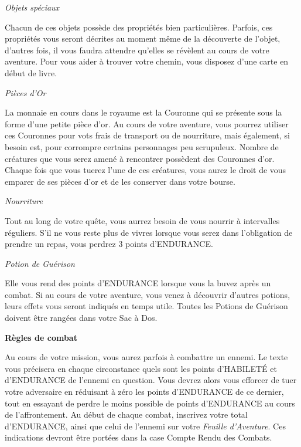 \documentclass[11pt]{book}
\begin{document}
\begin{center}
  \textit{Objets spéciaux}
\end{center}
Chacun de ces objets possède des propriétés bien particulières. Parfois, ces
propriétés vous seront décrites au moment même de la découverte de l'objet, d'autres
fois, il vous faudra attendre qu'elles se révèlent au cours de votre aventure. Pour
vous aider à trouver votre chemin, vous disposez d'une carte en début de livre.

\begin{center}
  \textit{Pièces d'Or}
\end{center}
La monnaie en cours dans le royaume est la Couronne qui se présente sous la forme
d'une petite pièce d'or. Au cours de votre aventure, vous pourrez utiliser ces
Couronnes pour vots frais de transport ou de nourriture, mais également, si besoin
est, pour corrompre certains personnages peu scrupuleux. Nombre de créatures que vous
serez amené à rencontrer possèdent des Couronnes d'or. Chaque fois que vous tuerez
l'une de ces créatures, vous aurez le droit de vous emparer de ses pièces d'or et de
les conserver dans votre bourse.

\begin{center}
  \textit{Nourriture}
\end{center}
Tout au long de votre quête, vous aurrez besoin de vous nourrir à intervalles
réguliers. S'il ne vous reste plus de vivres lorsque vous serez dans l'obligation
de prendre un repas, vous perdrez 3 points d'ENDURANCE.

\begin{center}
  \textit{Potion de Guérison}
\end{center}
Elle vous rend des points d'ENDURANCE lorsque vous la buvez après un combat.
Si au cours de votre aventure, vous venez à découvrir d'autres potions, leurs
effets vous seront indiqués en temps utile. Toutes les Potions de Guérison
doivent être rangées dans votre Sac à Dos.

\begin{center}
  \textbf{Règles de combat}
\end{center}
Au cours de votre mission, vous aurez parfois à combattre un ennemi. Le texte vous
précisera en chaque circonstance quels sont les points d'HABILETÉ et d'ENDURANCE de
l'ennemi en question. Vous devrez alors vous efforcer de tuer votre adversaire en
réduisant à zéro les points d'ENDURANCE de ce dernier, tout en essayant de perdre
le moins possible de points d'ENDURANCE au cours de l'affrontement. Au début de
chaque combat, inscrivez votre total d'ENDURANCE, ainsi que celui de l'ennemi sur
votre \textit{Feuille d'Aventure}. Ces indications devront être portées dans la case
Compte Rendu des Combats.\\
\end{document}

